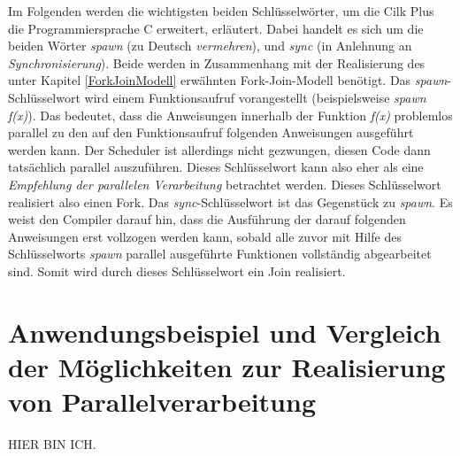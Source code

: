 			Im Folgenden werden die wichtigsten beiden Schlüsselwörter, um die Cilk Plus die Programmiersprache C erweitert, erläutert. Dabei handelt es sich um die beiden Wörter \textit{spawn} (zu Deutsch \textit{vermehren}), und \textit{sync} (in Anlehnung an \textit{Synchronisierung}). Beide werden in Zusammenhang mit der Realisierung des unter Kapitel \ref{ForkJoinModell} erwähnten Fork-Join-Modell benötigt. Das \textit{spawn}-Schlüsselwort wird einem Funktionsaufruf vorangestellt (beispielsweise \textit{spawn f(x)}). Das bedeutet, dass die Anweisungen innerhalb der Funktion \textit{f(x)} problemlos parallel zu den auf den Funktionsaufruf folgenden Anweisungen ausgeführt werden kann. Der Scheduler ist allerdings nicht gezwungen, diesen Code dann tatsächlich parallel auszuführen. Dieses Schlüsselwort kann also eher als eine \textit{Empfehlung der parallelen Verarbeitung} betrachtet werden. Dieses Schlüsselwort realisiert also einen Fork. Das \textit{sync}-Schlüsselwort ist das Gegenstück zu \textit{spawn}. Es weist den Compiler darauf hin, dass die Ausführung der darauf folgenden Anweisungen erst vollzogen werden kann, sobald alle zuvor mit Hilfe des Schlüsselworts \textit{spawn} parallel ausgeführte Funktionen vollständig abgearbeitet sind. Somit wird durch dieses Schlüsselwort ein Join realisiert. \cite{CilkWikipedia}
		
	\section{Anwendungsbeispiel und Vergleich der Möglichkeiten zur Realisierung von Parallelverarbeitung}
	
		HIER BIN ICH.